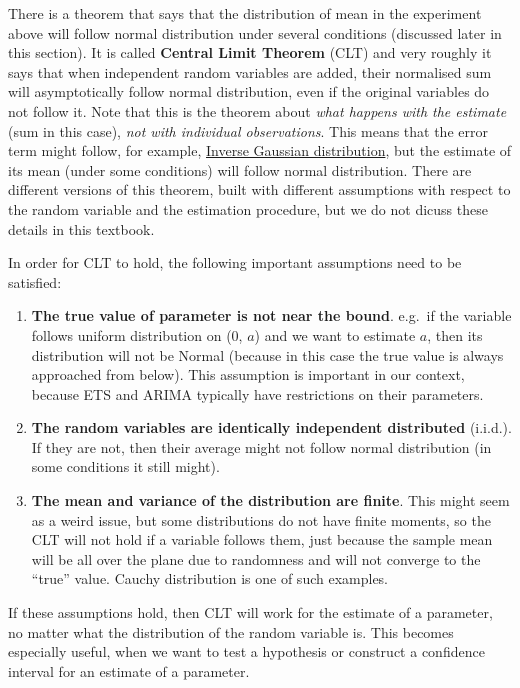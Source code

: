 \documentclass[
]{book}
\providecommand{\tightlist}{%
  \setlength{\itemsep}{0pt}\setlength{\parskip}{0pt}}
\theoremstyle{definition}
\theoremstyle{definition}
\theoremstyle{definition}
\theoremstyle{definition}
\theoremstyle{remark}
\begin{document}
There is a theorem that says that the distribution of mean in the experiment above will follow normal distribution under several conditions (discussed later in this section). It is called \textbf{Central Limit Theorem} (CLT) and very roughly it says that when independent random variables are added, their normalised sum will asymptotically follow normal distribution, even if the original variables do not follow it. Note that this is the theorem about \emph{what happens with the estimate} (sum in this case), \emph{not with individual observations}. This means that the error term might follow, for example, \hyperref[IGDistribution]{Inverse Gaussian distribution}, but the estimate of its mean (under some conditions) will follow normal distribution. There are different versions of this theorem, built with different assumptions with respect to the random variable and the estimation procedure, but we do not dicuss these details in this textbook.

In order for CLT to hold, the following important assumptions need to be satisfied:

\begin{enumerate}
\def\labelenumi{\arabic{enumi}.}
\tightlist
\item
  \textbf{The true value of parameter is not near the bound}. e.g.~if the variable follows uniform distribution on (0, \(a\)) and we want to estimate \(a\), then its distribution will not be Normal (because in this case the true value is always approached from below). This assumption is important in our context, because ETS and ARIMA typically have restrictions on their parameters.
\item
  \textbf{The random variables are identically independent distributed} (i.i.d.). If they are not, then their average might not follow normal distribution (in some conditions it still might).
\item
  \textbf{The mean and variance of the distribution are finite}. This might seem as a weird issue, but some distributions do not have finite moments, so the CLT will not hold if a variable follows them, just because the sample mean will be all over the plane due to randomness and will not converge to the ``true'' value. Cauchy distribution is one of such examples.
\end{enumerate}

If these assumptions hold, then CLT will work for the estimate of a parameter, no matter what the distribution of the random variable is. This becomes especially useful, when we want to test a hypothesis or construct a confidence interval for an estimate of a parameter.
\end{document}
